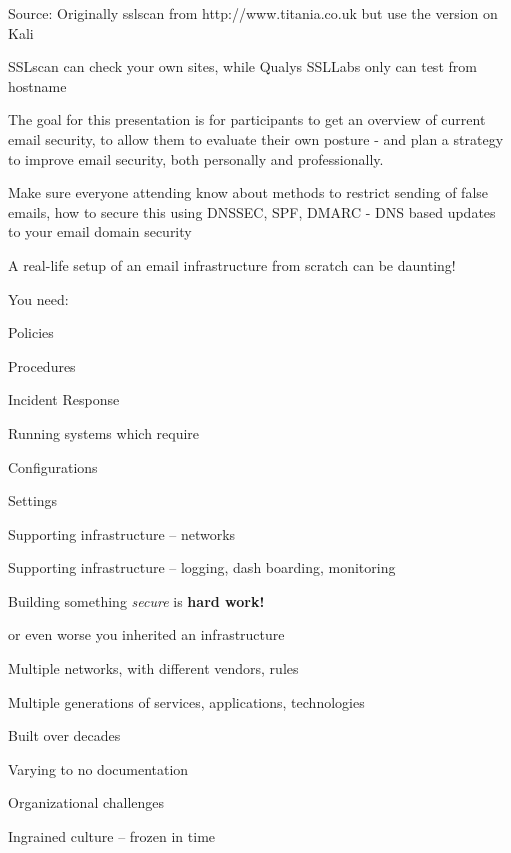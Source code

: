 \documentclass[Screen16to9,17pt]{foils}
\begin{document}
Source:
Originally sslscan from http://www.titania.co.uk
 but use the version on Kali

SSLscan can check your own sites, while Qualys SSLLabs only can test from hostname



The goal for this presentation is for participants to get an overview of current email security, to allow them to evaluate their own posture - and plan a strategy to improve email security, both personally and professionally.

Make sure everyone attending know about methods to restrict sending of false
emails, how to secure this using DNSSEC, SPF, DMARC - DNS based updates to your
email domain security


\begin{list1}
\item A real-life setup of an email infrastructure from scratch can be daunting!
\item You need:
\begin{list2}
\item Policies
\item Procedures
\item Incident Response
\end{list2}
\item Running systems which require
\begin{list2}
\item Configurations
\item Settings
\item Supporting infrastructure -- networks
\item Supporting infrastructure -- logging, dash boarding, monitoring
\end{list2}
\item Building something \emph{secure} is {\bf hard work!}
\end{list1}



\begin{list1}
\item or even worse you inherited an infrastructure
\item Multiple networks, with different vendors, rules
\item Multiple generations of services, applications, technologies
\item Built over decades
\item Varying to no documentation
\item Organizational challenges
\item Ingrained culture -- frozen in time
\end{list1}
\end{document}
